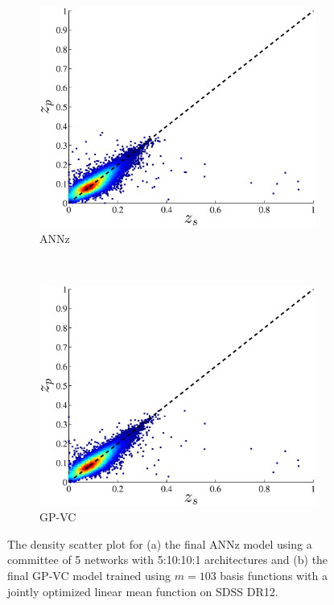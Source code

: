 \documentclass[useAMS,usenatbib,fleqn]{mn2e}
\begin{document}
\begin{figure}
        \centering
       
       \begin{subfigure}[b]{\columnwidth}
                \includegraphics[width=\columnwidth]{figures/ANN_final_sdss.eps}
        \caption{{\sc ANNz}}
        \end{subfigure}
        ~ 
        \begin{subfigure}[b]{\columnwidth}
                \includegraphics[width=\columnwidth]{figures/GPVC_final_sdss.eps}
        \caption{GP-VC}
        \end{subfigure}

       \caption{The density scatter plot for (a) the final {\sc ANNz} model using a committee of 5 networks with 5:10:10:1 architectures and (b) the final GP-VC model trained using $m=103$ basis functions with a jointly optimized linear mean function on SDSS DR12. }
       \label{fig-final-model-sdss}
\end{figure}
\end{document}
